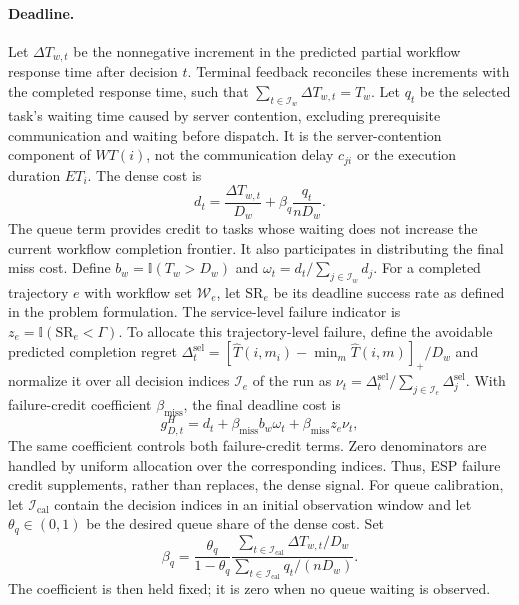 \documentclass[lettersize,journal]{IEEEtran}
\begin{document}
\paragraph{Deadline.}
Let $\Delta T_{w,t}$ be the nonnegative increment in the predicted
partial workflow response time after decision $t$. Terminal feedback
reconciles these increments with the completed response time, such that
$\sum_{t\in\mathcal I_w}\Delta T_{w,t}=T_w$.
Let $q_t$ be the selected task's waiting time caused by server contention,
excluding prerequisite communication and waiting before dispatch.
It is the server-contention component of $WT(i)$, not the
communication delay $c_{ji}$ or the execution duration $ET_i$.
The dense cost is
\begin{equation}
 d_t=\frac{\Delta T_{w,t}}{D_w}
 +\beta_q\frac{q_t}{nD_w}.
 \label{eq:method_dense_cost}
\end{equation}
The queue term provides credit to tasks whose waiting does not increase
the current workflow completion frontier. It also participates in
distributing the final miss cost. Define
$b_w=\mathbb{I}(T_w>D_w)$ and
$\omega_t=d_t/\sum_{j\in\mathcal I_w}d_j$.
For a completed trajectory $e$ with workflow set $\mathcal W_e$, let
$\mathrm{SR}_e$ be its deadline success rate as defined in the problem
formulation. The service-level failure indicator is
$z_e=\mathbb{I}(\mathrm{SR}_e<\Gamma)$.
To allocate this trajectory-level failure, define the avoidable
predicted completion regret
$\Delta_t^{\mathrm{sel}}=[\widehat T(i,m_i)-\min_m\widehat T(i,m)]_+/D_w$
and normalize it
over all decision indices $\mathcal I_e$ of the run as
$\nu_t=\Delta_t^{\mathrm{sel}}/\sum_{j\in\mathcal I_e}\Delta_j^{\mathrm{sel}}$.
With failure-credit coefficient $\beta_{\mathrm{miss}}$, the final deadline cost is
\begin{equation}
 g_{D,t}^H=d_t+\beta_{\mathrm{miss}} b_w\omega_t
 +\beta_{\mathrm{miss}} z_e\nu_t,
 \label{eq:method_high_deadline}
\end{equation}
The same coefficient controls both failure-credit terms. Zero denominators
are handled by uniform allocation over the corresponding indices.
Thus, ESP failure credit supplements, rather than replaces, the dense
signal. For queue calibration, let $\mathcal I_{\mathrm{cal}}$ contain
the decision indices in an initial observation window and let
$\theta_q\in(0,1)$ be the desired queue share of the dense cost. Set
\begin{equation}
 \beta_q=\frac{\theta_q}{1-\theta_q}
 \frac{\sum_{t\in\mathcal I_{\mathrm{cal}}}\Delta T_{w,t}/D_w}
 {\sum_{t\in\mathcal I_{\mathrm{cal}}}q_t/(nD_w)}.
 \label{eq:method_queue_calibration}
\end{equation}
The coefficient is then held fixed;
it is zero when no queue waiting is observed.
\end{document}
